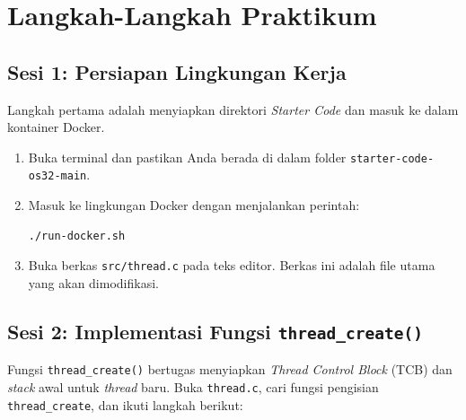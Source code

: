 \newpage
\section{Langkah-Langkah Praktikum}

\subsection{Sesi 1: Persiapan Lingkungan Kerja}
\label{sec:m08-sesi-1}
Langkah pertama adalah menyiapkan direktori \textit{Starter Code} dan masuk ke dalam kontainer Docker.

\begin{enumerate}
    \item Buka terminal dan pastikan Anda berada di dalam folder \texttt{starter-code-os32-main}.
    \item Masuk ke lingkungan Docker dengan menjalankan perintah:
    \begin{lstlisting}[language=bash, caption={Masuk ke lingkungan kontainer}]
./run-docker.sh
    \end{lstlisting}
    \item Buka berkas \texttt{src/thread.c} pada teks editor. Berkas ini adalah file utama yang akan dimodifikasi.
\end{enumerate}

\subsection{Sesi 2: Implementasi Fungsi \texttt{thread\_create()}}
\label{sec:m08-sesi-2}
Fungsi \texttt{thread\_create()} bertugas menyiapkan \textit{Thread Control Block} (TCB) dan \textit{stack} awal untuk \textit{thread} baru. Buka \texttt{thread.c}, cari fungsi pengisian \texttt{thread\_create}, dan ikuti langkah berikut:

